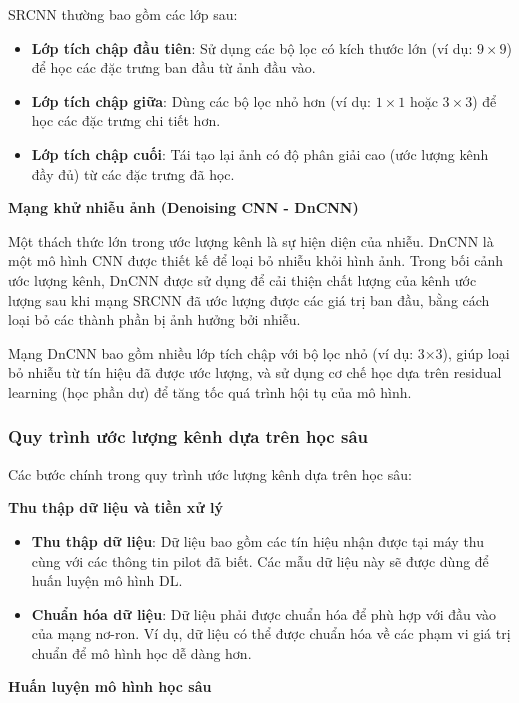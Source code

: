 SRCNN thường bao gồm các lớp sau:
\begin{itemize}
    \item \textbf{Lớp tích chập đầu tiên}: 
    Sử dụng các bộ lọc có kích thước lớn (ví dụ: $9 \times 9$) để học các đặc trưng ban đầu từ ảnh đầu vào.
    \item \textbf{Lớp tích chập giữa}: 
    Dùng các bộ lọc nhỏ hơn (ví dụ: $1 \times 1$ hoặc $3 \times 3$) để học các đặc trưng chi tiết hơn.
    \item \textbf{Lớp tích chập cuối}: 
    Tái tạo lại ảnh có độ phân giải cao (ước lượng kênh đầy đủ) từ các đặc trưng đã học.
\end{itemize}

\textbf{Mạng khử nhiễu ảnh (Denoising CNN - DnCNN)}

Một thách thức lớn trong ước lượng kênh là sự hiện diện của nhiễu. 
DnCNN là một mô hình CNN được thiết kế để loại bỏ nhiễu khỏi hình ảnh. 
Trong bối cảnh ước lượng kênh, DnCNN được sử dụng để cải thiện chất lượng của kênh ước lượng sau khi mạng SRCNN đã ước lượng được các giá trị ban đầu, 
bằng cách loại bỏ các thành phần bị ảnh hưởng bởi nhiễu.

Mạng DnCNN bao gồm nhiều lớp tích chập với bộ lọc nhỏ (ví dụ: 3×3), 
giúp loại bỏ nhiễu từ tín hiệu đã được ước lượng, 
và sử dụng cơ chế học dựa trên residual learning (học phần dư) để tăng tốc quá trình hội tụ của mô hình.

\subsubsection{Quy trình ước lượng kênh dựa trên học sâu}

Các bước chính trong quy trình ước lượng kênh dựa trên học sâu:

\textbf{Thu thập dữ liệu và tiền xử lý}

\begin{itemize}
    \item \textbf{Thu thập dữ liệu}: 
    Dữ liệu bao gồm các tín hiệu nhận được tại máy thu cùng với các thông tin pilot đã biết. 
    Các mẫu dữ liệu này sẽ được dùng để huấn luyện mô hình DL.
    \item \textbf{Chuẩn hóa dữ liệu}: 
    Dữ liệu phải được chuẩn hóa để phù hợp với đầu vào của mạng nơ-ron. 
    Ví dụ, dữ liệu có thể được chuẩn hóa về các phạm vi giá trị chuẩn để mô hình học dễ dàng hơn.
\end{itemize}

\textbf{Huấn luyện mô hình học sâu}

